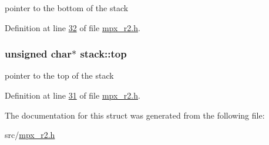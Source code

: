 pointer to the bottom of the stack 



Definition at line \hyperlink{mpx__r2_8h_source_l00032}{32} of file \hyperlink{mpx__r2_8h_source}{mpx\_\-r2.h}.

\hypertarget{structstack_adf145fa22a24464ff19409e2618a583d}{
\subsubsection[{top}]{\setlength{\rightskip}{0pt plus 5cm}unsigned char$\ast$ {\bf stack::top}}}
\label{structstack_adf145fa22a24464ff19409e2618a583d}


pointer to the top of the stack 



Definition at line \hyperlink{mpx__r2_8h_source_l00031}{31} of file \hyperlink{mpx__r2_8h_source}{mpx\_\-r2.h}.



The documentation for this struct was generated from the following file:\begin{DoxyCompactItemize}
\item 
src/\hyperlink{mpx__r2_8h}{mpx\_\-r2.h}\end{DoxyCompactItemize}
